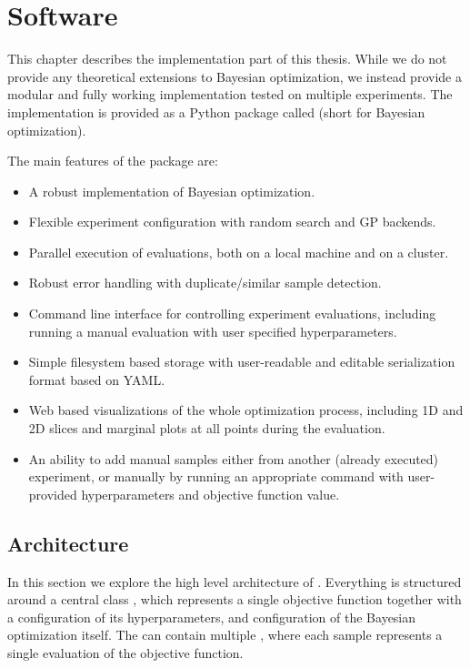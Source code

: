 \chapter{Software}
\label{chapter:software}

This chapter describes the implementation part of this thesis. While we do not provide any theoretical extensions to Bayesian optimization, we instead provide a modular and fully working implementation tested on multiple experiments. The implementation is provided as a Python \citep{python} package called \bopt (short for Bayesian optimization).

The main features of the package are:

\begin{itemize}
	\item A robust implementation of Bayesian optimization.
    \item Flexible experiment configuration with random search and GP backends.
    \item Parallel execution of evaluations, both on a local machine and on a cluster.
    \item Robust error handling with duplicate/similar sample detection.
    \item Command line interface for controlling experiment evaluations, including running a manual evaluation with user specified hyperparameters.
    \item Simple filesystem based storage with user-readable and editable serialization format based on YAML.
    \item Web based visualizations of the whole optimization process, including
    1D and 2D slices and marginal plots at all points during the evaluation.
    \item An ability to add manual samples either from another (already executed) experiment, or manually by running an appropriate command with user-provided hyperparameters and objective function value.
\end{itemize}


\section{Architecture}

In this section we explore the high level architecture of \bopt. Everything is structured around a central class , which represents a single objective function together with a configuration of its hyperparameters, and configuration of the Bayesian optimization itself. The  can contain multiple , where each sample represents a single evaluation of the objective function.

